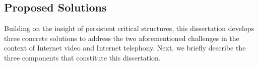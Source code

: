 


\subsection{Proposed Solutions}
Building on the insight of persistent critical structures, this dissertation develops 
three concrete solutions
to address the two aforementioned challenges in the context
of Internet video and Internet telephony. 
Next, we briefly describe the three components that constitute 
this dissertation.



